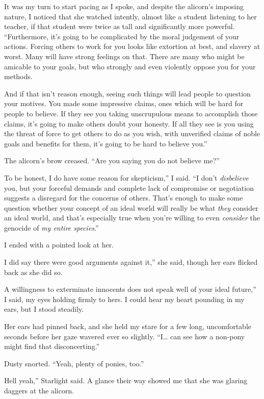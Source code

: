 It was my turn to start pacing as I spoke, and despite the alicorn’s imposing nature, I noticed that she watched intently, almost like a student listening to her teacher, if that student were twice as tall and significantly more powerful. “Furthermore, it’s going to be complicated by the moral judgement of your actions. Forcing others to work for you looks like extortion at best, and slavery at worst. Many will have strong feelings on that. There are many who might be amicable to your goals, but who strongly and even violently oppose you for your methods.

\leavevmode{}And if that isn’t reason enough, seeing such things will lead people to question your motives. You made some impressive claims, ones which will be hard for people to believe. If they see you taking unscrupulous means to accomplish those claims, it’s going to make others doubt your honesty. If all they see is you using the threat of force to get others to do as you wish, with unverified claims of noble goals and benefits for them, it’s going to be hard to believe you.”

The alicorn’s brow creased. “Are you saying you do not believe me?”

\leavevmode{}To be honest, I do have some reason for skepticism,” I said. “I don’t \textit{disbelieve} you, but your forceful demands and complete lack of compromise or negotiation suggests a disregard for the concerns of others. That’s enough to make some question whether your concept of an ideal world will really be what \textit{they} consider an ideal world, and that’s especially true when you’re willing to even \textit{consider} the genocide of \textit{my entire species}.”

I ended with a pointed look at her.

\leavevmode{}I did say there were good arguments against it,” she said, though her ears flicked back as she did so.

\leavevmode{}A willingness to exterminate innocents does not speak well of your ideal future,” I said, my eyes holding firmly to hers. I could hear my heart pounding in my ears, but I stood steadily.

Her ears had pinned back, and she held my stare for a few long, uncomfortable seconds before her gaze wavered ever so slightly. “I… can see how a non-pony might find that disconcerting.”

Dusty snorted. “Yeah, plenty of ponies, too.”

\leavevmode{}Hell yeah,” Starlight said. A glance their way showed me that she was glaring daggers at the alicorn.

